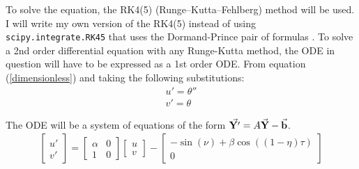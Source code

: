 \documentclass[12pt]{article}
\begin{document}
To solve the equation, the RK4(5) (Runge–Kutta–Fehlberg) method will be used. I will write my own version of the RK4(5) instead of using \verb|scipy.integrate.RK45| that uses the Dormand-Prince pair of formulas \cite{DormandPrince}. To solve a 2nd order differential equation with any Runge-Kutta method, the ODE in question will have to be expressed as a 1st order ODE. 
From equation (\ref{dimensionless}) and taking the following substitutions:
\begin{equation}
    \begin{split}
        u' = \theta''
        \\
        v' = \theta
    \end{split}
\end{equation}

The ODE will be a system of equations of the form $\vec{\bold{Y'}} = A\vec{\bold{Y}} - \vec{\bold{b}}$.
\begin{gather}
    \begin{bmatrix}
        u' \\ 
        v'
    \end{bmatrix}
    =
    \begin{bmatrix}
        \alpha & 0 \\
        1 & 0
    \end{bmatrix}
    \begin{bmatrix}
        u \\ 
        v
    \end{bmatrix}
    -
    \begin{bmatrix}
        -\sin(\nu) + \beta\cos((1 - \eta)\tau) \\
        0
    \end{bmatrix}
\end{gather}


%
%
\end{document}
